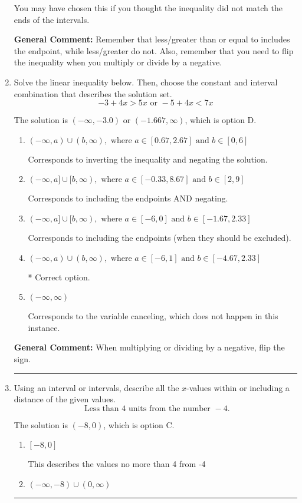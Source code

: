 \documentclass{extbook}[14pt]
\newcommand{\litem}[1]{\item #1

\rule{\textwidth}{0.4pt}}
\begin{document}
\begin{enumerate}
{\begin{enumerate}[label=\Alph*.]
You may have chosen this if you thought the inequality did not match the ends of the intervals.
\end{enumerate}

\textbf{General Comment:} Remember that less/greater than or equal to includes the endpoint, while less/greater do not. Also, remember that you need to flip the inequality when you multiply or divide by a negative.
}
\litem{
Solve the linear inequality below. Then, choose the constant and interval combination that describes the solution set.
\[ -3 + 4 x > 5 x \text{ or } -5 + 4 x < 7 x \]

The solution is \( (-\infty, -3.0) \text{ or } (-1.667, \infty) \), which is option D.\begin{enumerate}[label=\Alph*.]
\item \( (-\infty, a) \cup (b, \infty), \text{ where } a \in [0.67, 2.67] \text{ and } b \in [0, 6] \)

Corresponds to inverting the inequality and negating the solution.
\item \( (-\infty, a] \cup [b, \infty), \text{ where } a \in [-0.33, 8.67] \text{ and } b \in [2, 9] \)

Corresponds to including the endpoints AND negating.
\item \( (-\infty, a] \cup [b, \infty), \text{ where } a \in [-6, 0] \text{ and } b \in [-1.67, 2.33] \)

Corresponds to including the endpoints (when they should be excluded).
\item \( (-\infty, a) \cup (b, \infty), \text{ where } a \in [-6, 1] \text{ and } b \in [-4.67, 2.33] \)

 * Correct option.
\item \( (-\infty, \infty) \)

Corresponds to the variable canceling, which does not happen in this instance.
\end{enumerate}

\textbf{General Comment:} When multiplying or dividing by a negative, flip the sign.
}
\litem{
Using an interval or intervals, describe all the $x$-values within or including a distance of the given values.
\[ \text{ Less than } 4 \text{ units from the number } -4. \]

The solution is \( (-8, 0) \), which is option C.\begin{enumerate}[label=\Alph*.]
\item \( [-8, 0] \)

This describes the values no more than 4 from -4
\item \( (-\infty, -8) \cup (0, \infty) \)


\end{enumerate}}
\end{enumerate}
\end{document}
